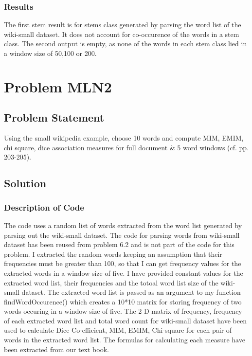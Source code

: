 \documentclass[12pt]{report}
\begin{document}
\subsection{Results}
The first stem result is for stems class generated by parsing the word list of the wiki-small dataset. It does not account for co-occurence of the words in a stem class. The second output is empty, as none of the words in each stem class lied in a window size of 50,100 or 200. 

\chapter{Problem MLN2}
\section{Problem Statement}
Using the small wikipedia example, choose 10 words and compute MIM, EMIM, chi square, dice association measures for full document \& 5 word windows (cf. pp. 203-205).   
\section{Solution}
\subsection{Description of Code}
The code uses a random list of words extracted from the word list generated by parsing out the wiki-small dataset. The code for parsing words from wiki-small dataset has been reused from problem 6.2 and is not part of the code for this problem. I extracted the random words keeping an assumption that their frequencies must be greater than 100, so that I can get frequency values for the extracted words in a window size of five. I have provided constant values for the extracted word list, their frequencies and the totoal word list size of the wiki-small dataset. The extracted word list is passed as an argument to my function findWordOccurence() which creates a 10*10 matrix for storing frequency of two words occuring in a window size of five. The 2-D matrix of frequency, frequency of each extracted word list and total word count for wiki-small dataset have been used to calculate Dice Co-efficient, MIM, EMIM, Chi-square  for each pair of words in the extracted word list. The formulas for calculating each measure have been extracted from our text book.



\end{document}
